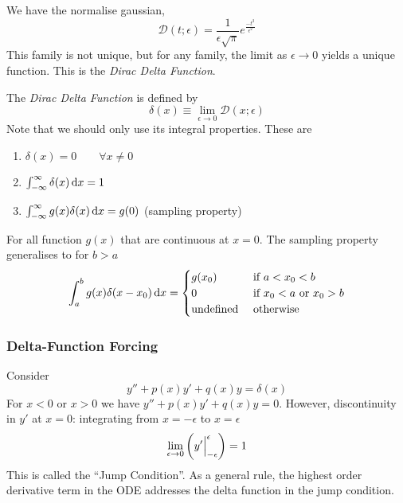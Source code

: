 \documentclass{article}
\begin{document}
\begin{remark}
    We have the normalise gaussian,
    \[
        \mathcal{D}(t; \epsilon) = \frac{1}{\epsilon \sqrt{\pi}} e^{\frac{-t^2}{\epsilon^2}}
    \]
    This family is not unique, but for any family, the limit as $\epsilon \rightarrow 0$ yields a unique function.
    This is the \emph{Dirac Delta Function}.
\end{remark}
\begin{defi}
    The \emph{Dirac Delta Function} is defined by
    \[
        \delta(x) \equiv \lim_{\epsilon \rightarrow 0} \mathcal{D}(x; \epsilon) 
    \]
    Note that we should only use its integral properties. These are
    \begin{enumerate}
        \item $\delta(x) = 0 \qquad \forall x \neq 0 $
        \item $\int_{-\infty}^{\infty}{\delta(x) \mathop{}\!\mathrm{d} x} = 1$
        \item $\int_{-\infty}^{\infty}{g(x)\delta(x) \mathop{}\!\mathrm{d} x} = g(0)$ (sampling property)
    \end{enumerate}
    For all function $g(x)$ that are continuous at $x = 0$. 
    The sampling property generalises to for $b > a$
    \[
        \int_{a}^{b}{g(x)\delta(x - x_0) \mathop{}\!\mathrm{d} x} = \begin{cases}
            g(x_0) & \text{ if } a < x_0 < b \\
            0 & \text{ if } x_0 < a \text{ or } x_0 > b\\
            \text{undefined} & \text{ otherwise}
        \end{cases}
    \]
\end{defi}
\subsubsection{Delta-Function Forcing}
Consider 
\[
    y'' + p(x)y' + q(x) y = \delta(x)
\]
For $x < 0$ or $x > 0$ we have $y'' + p(x)y' + q(x) y = 0$.
However, discontinuity in $y'$ at $x = 0$: integrating from $x = - \epsilon$ to $x = \epsilon$
\[
    \lim_{\epsilon \rightarrow 0} \left( y' \Big{|}_{- \epsilon}^{\epsilon} \right) = 1
\]
This is called the ``Jump Condition''.
As a general rule, the highest order derivative term in the ODE addresses the delta function in the jump condition.
\end{document}
